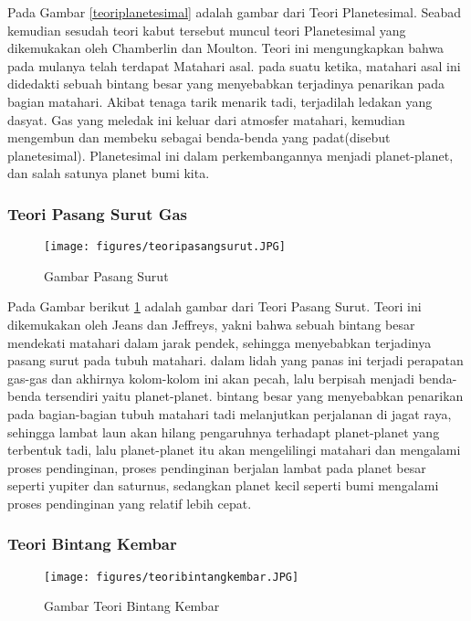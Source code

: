 Pada Gambar \ref{teoriplanetesimal} adalah gambar dari Teori Planetesimal. Seabad kemudian sesudah teori kabut tersebut muncul teori Planetesimal yang dikemukakan oleh Chamberlin dan Moulton. Teori ini mengungkapkan bahwa pada mulanya telah terdapat Matahari asal. pada suatu ketika, matahari asal ini didedakti sebuah bintang besar yang menyebabkan terjadinya penarikan pada bagian matahari. Akibat tenaga tarik menarik tadi, terjadilah ledakan yang dasyat. Gas yang meledak ini keluar dari atmosfer matahari, kemudian mengembun dan membeku sebagai benda-benda yang padat(disebut planetesimal). Planetesimal ini dalam perkembangannya menjadi planet-planet, dan salah satunya planet bumi kita.

\subsubsection{Teori Pasang Surut Gas}
\begin{figure} [ht]
	\centerline{\texttt{[image: figures/teoripasangsurut.JPG]}}
	\caption{Gambar Pasang Surut}
	\label{teoripasangsurut}
	\end{figure}

Pada Gambar berikut \ref{teoripasangsurut} adalah gambar dari Teori Pasang Surut.
Teori ini dikemukakan oleh Jeans dan Jeffreys, yakni bahwa sebuah bintang besar mendekati matahari dalam jarak pendek, sehingga menyebabkan terjadinya pasang surut pada tubuh matahari. dalam lidah yang panas ini terjadi perapatan gas-gas dan akhirnya kolom-kolom ini akan pecah, lalu berpisah menjadi benda-benda tersendiri yaitu planet-planet. bintang besar yang menyebabkan penarikan pada bagian-bagian tubuh matahari tadi melanjutkan perjalanan di jagat raya, sehingga lambat laun akan hilang pengaruhnya terhadapt planet-planet yang terbentuk tadi, lalu planet-planet itu akan mengelilingi matahari dan mengalami proses pendinginan, proses pendinginan berjalan lambat pada planet besar seperti yupiter dan saturnus, sedangkan planet kecil seperti bumi mengalami proses pendinginan yang relatif lebih cepat.

\subsubsection{Teori Bintang Kembar}
\begin{figure} [ht]
	\centerline{\texttt{[image: figures/teoribintangkembar.JPG]}}
	\caption{Gambar Teori Bintang Kembar}
	\label{teoribintangkembar}
	\end{figure}

